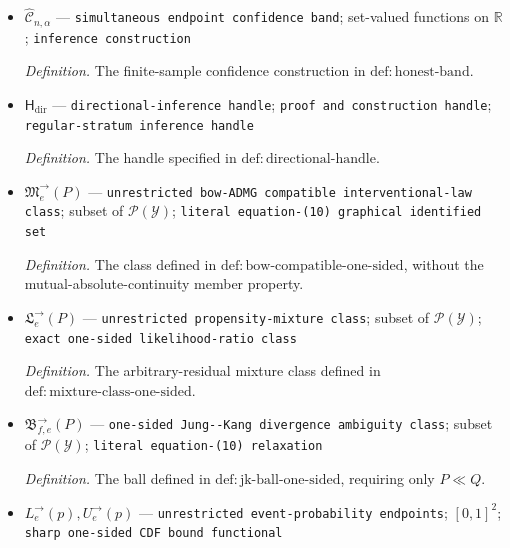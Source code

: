 \documentclass{article}
\begin{document}
\begin{itemize}
  \par\smallskip\noindent\emph{Definition.} \(\widehat e_n=n^{-1}\sum_{i=1}^n\mathbf 1\{A_i=a\}\) and \(\widehat F_{P,n}(y)=n_a^{-1}\sum_{i:A_i=a}\mathbf 1\{Y_i\le y\}\) when \(n_a>0\).
  \item \(\widehat{\mathcal C}_{n,\alpha}\) --- \texttt{simultaneous endpoint confidence band}; set-valued functions on \(\mathbb R\); \texttt{inference construction}
  \par\smallskip\noindent\emph{Definition.} The finite-sample confidence construction in \(\mathrm{def:honest\text{-}band}\).
  \item \(\mathsf H_{\mathrm{dir}}\) --- \texttt{directional-\allowbreak{}inference handle}; \texttt{proof and construction handle}; \texttt{regular-\allowbreak{}stratum inference handle}
  \par\smallskip\noindent\emph{Definition.} The handle specified in \(\mathrm{def:directional\text{-}handle}\).
  \item \(\mathfrak M^{\to}_e(P)\) --- \texttt{unrestricted bow-\allowbreak{}ADMG compatible interventional-\allowbreak{}law class}; subset of \(\mathcal P(\mathcal Y)\); \texttt{literal equation-\allowbreak{}(10) graphical identified set}
  \par\smallskip\noindent\emph{Definition.} The class defined in \(\mathrm{def:bow\text{-}compatible\text{-}one\text{-}sided}\), without the mutual-absolute-continuity member property.
  \item \(\mathfrak L^{\to}_e(P)\) --- \texttt{unrestricted propensity-\allowbreak{}mixture class}; subset of \(\mathcal P(\mathcal Y)\); \texttt{exact one-\allowbreak{}sided likelihood-\allowbreak{}ratio class}
  \par\smallskip\noindent\emph{Definition.} The arbitrary-residual mixture class defined in \(\mathrm{def:mixture\text{-}class\text{-}one\text{-}sided}\).
  \item \(\mathfrak B^{\to}_{f,e}(P)\) --- \texttt{one-\allowbreak{}sided Jung-\allowbreak{}-\allowbreak{}Kang divergence ambiguity class}; subset of \(\mathcal P(\mathcal Y)\); \texttt{literal equation-\allowbreak{}(10) relaxation}
  \par\smallskip\noindent\emph{Definition.} The ball defined in \(\mathrm{def:jk\text{-}ball\text{-}one\text{-}sided}\), requiring only \(P\ll Q\).
  \item \(L^{\to}_e(p),U^{\to}_e(p)\) --- \texttt{unrestricted event-\allowbreak{}probability endpoints}; \([0,1]^2\); \texttt{sharp one-\allowbreak{}sided CDF bound functional}

\end{itemize}
\end{document}
